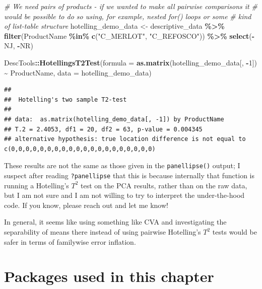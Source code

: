\documentclass[
]{book}
\newenvironment{Shaded}{\begin{snugshade}}{\end{snugshade}}
\newcommand{\AttributeTok}[1]{\textcolor[rgb]{0.13,0.29,0.53}{#1}}
\newcommand{\CommentTok}[1]{\textcolor[rgb]{0.56,0.35,0.01}{\textit{#1}}}
\newcommand{\DecValTok}[1]{\textcolor[rgb]{0.00,0.00,0.81}{#1}}
\newcommand{\FunctionTok}[1]{\textcolor[rgb]{0.13,0.29,0.53}{\textbf{#1}}}
\newcommand{\NormalTok}[1]{#1}
\newcommand{\OtherTok}[1]{\textcolor[rgb]{0.56,0.35,0.01}{#1}}
\newcommand{\SpecialCharTok}[1]{\textcolor[rgb]{0.81,0.36,0.00}{\textbf{#1}}}
\newcommand{\StringTok}[1]{\textcolor[rgb]{0.31,0.60,0.02}{#1}}
\begin{document}
\begin{Shaded}
\begin{Highlighting}[]
\CommentTok{\# We need pairs of products {-} if we wanted to make all pairwise comparisons it}
\CommentTok{\# would be possible to do so using, for example, nested \textasciigrave{}for()\textasciigrave{} loops or some}
\CommentTok{\# kind of list{-}table structure}
\NormalTok{hotelling\_demo\_data }\OtherTok{\textless{}{-}} 
\NormalTok{  descriptive\_data }\SpecialCharTok{\%\textgreater{}\%}
  \FunctionTok{filter}\NormalTok{(ProductName }\SpecialCharTok{\%in\%} \FunctionTok{c}\NormalTok{(}\StringTok{"C\_MERLOT"}\NormalTok{, }\StringTok{"C\_REFOSCO"}\NormalTok{)) }\SpecialCharTok{\%\textgreater{}\%}
  \FunctionTok{select}\NormalTok{(}\SpecialCharTok{{-}}\NormalTok{NJ, }\SpecialCharTok{{-}}\NormalTok{NR)}

\NormalTok{DescTools}\SpecialCharTok{::}\FunctionTok{HotellingsT2Test}\NormalTok{(}\AttributeTok{formula =} \FunctionTok{as.matrix}\NormalTok{(hotelling\_demo\_data[, }\SpecialCharTok{{-}}\DecValTok{1}\NormalTok{]) }\SpecialCharTok{\textasciitilde{}}\NormalTok{ ProductName,}
                            \AttributeTok{data =}\NormalTok{ hotelling\_demo\_data)}
\end{Highlighting}
\end{Shaded}

\begin{verbatim}
## 
##  Hotelling's two sample T2-test
## 
## data:  as.matrix(hotelling_demo_data[, -1]) by ProductName
## T.2 = 2.4053, df1 = 20, df2 = 63, p-value = 0.004345
## alternative hypothesis: true location difference is not equal to c(0,0,0,0,0,0,0,0,0,0,0,0,0,0,0,0,0,0,0,0)
\end{verbatim}

These results are not the same as those given in the \texttt{panellipse()} output; I suspect after reading \texttt{?panellipse} that this is because internally that function is running a Hotelling's \(T^2\) test on the PCA results, rather than on the raw data, but I am not sure and I am not willing to try to interpret the under-the-hood code. If you know, please reach out and let me know!

In general, it seems like using something like CVA and investigating the separability of means there instead of using pairwise Hotelling's \(T^2\) tests would be safer in terms of familywise error inflation.

\section{Packages used in this chapter}\label{packages-used-in-this-chapter-5}
\end{document}
